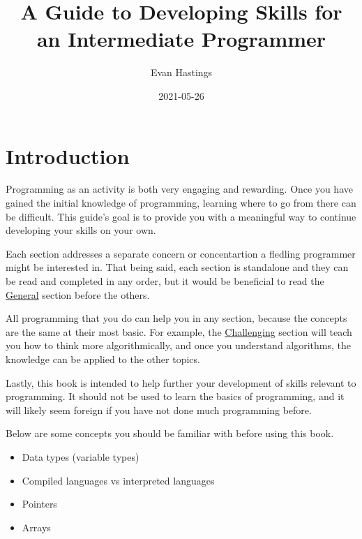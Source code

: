 \documentclass[12pt, oneside, a4paper]{book}
\title{A Guide to Developing Skills for an Intermediate Programmer}
\date{2021-05-26}
\author{Evan Hastings}
\begin{document}
   \maketitle
   \newpage
   \tableofcontents
   \newpage
   \chapter{Introduction}
      Programming as an activity is both very engaging and rewarding.
      Once you have gained the initial knowledge of programming, learning where to go from there can be difficult.
      This guide's goal is to provide you with a meaningful way to continue developing your skills on your own.

      Each section addresses a separate concern or concentartion a fledling programmer might be interested in.
      That being said, each section is standalone and they can be read and completed in any order, but it would be beneficial to read the \hyperref[chap:general]{General} section before the others.

      All programming that you do can help you in any section, because the concepts are the same at their most basic.
      For example, the \hyperref[chap:challenge]{Challenging} section will teach you how to think more algorithmically, and once you understand algorithms, the knowledge can be applied to the other topics.

      Lastly, this book is intended to help further your development of skills relevant to programming.
      It should not be used to learn the basics of programming, and it will likely seem foreign if you have not done much programming before.

      Below are some concepts you should be familiar with before using this book\footnotemark.

      \begin{itemize}
         \item Data types (variable types)
         \item Compiled languages vs interpreted languages
         \item Pointers
         \item Arrays

      \end{itemize}
\end{document}
